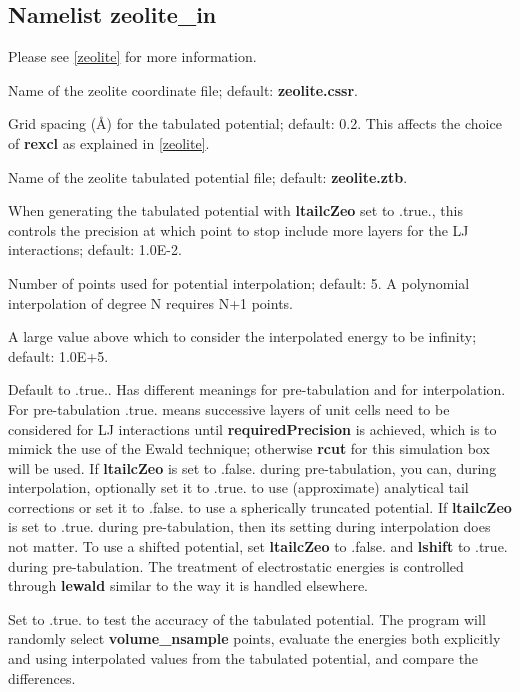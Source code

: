 \documentclass[12pt,letterpaper]{article}
\begin{document}
\subsection{Namelist \textbf{zeolite\_in}}
\label{zeolite_in}
Please see \ref{zeolite} for more information.

 Name of the zeolite
coordinate file; default: \textbf{zeolite.cssr}.

 Grid spacing (\AA) for the tabulated
potential; default: 0.2. This affects the choice of
\textbf{rexcl} as explained in \ref{zeolite}.

 Name of the zeolite tabulated
potential file; default: \textbf{zeolite.ztb}.

 When generating the
tabulated potential with \textbf{ltailcZeo} set to .true.,
this controls the precision at which point to stop include
more layers for the LJ interactions; default: 1.0E-2.

 Number of points
used for potential interpolation; default: 5. A polynomial
interpolation of degree N requires N+1 points.

 A large value above which to
consider the interpolated energy to be infinity; default:
1.0E+5.

 Default to .true.. Has different
meanings for pre-tabulation and for interpolation. For
pre-tabulation .true. means successive layers of unit cells
need to be considered for LJ interactions until
\textbf{requiredPrecision} is achieved, which is to mimick
the use of the Ewald technique; otherwise \textbf{rcut} for
this simulation box will be used. If \textbf{ltailcZeo} is
set to .false. during pre-tabulation, you can, during
interpolation, optionally set it to .true. to use
(approximate) analytical tail corrections or set it to
.false. to use a spherically truncated potential. If
\textbf{ltailcZeo} is set to .true. during pre-tabulation,
then its setting during interpolation does not matter. To
use a shifted potential, set \textbf{ltailcZeo} to .false.
and \textbf{lshift} to .true. during pre-tabulation. The
treatment of electrostatic energies is controlled through
\textbf{lewald} similar to the way it is handled elsewhere.

 Set to .true. to test the accuracy
of the tabulated potential. The program will randomly select
\textbf{volume\_nsample} points, evaluate the energies both
explicitly and using interpolated values from the tabulated
potential, and compare the differences.
\end{document}
